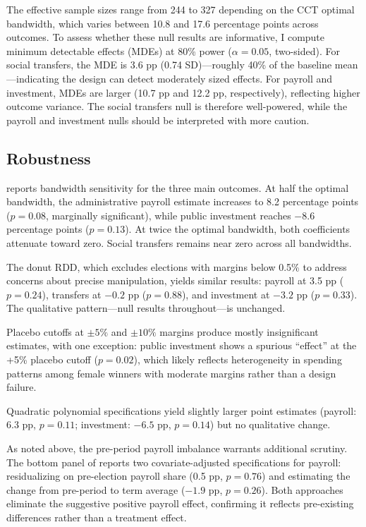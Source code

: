 \documentclass[12pt]{article}
\begin{document}
The effective sample sizes range from 244 to 327 depending on the CCT optimal bandwidth, which varies between 10.8 and 17.6 percentage points across outcomes. To assess whether these null results are informative, I compute minimum detectable effects (MDEs) at 80\% power ($\alpha=0.05$, two-sided). For social transfers, the MDE is 3.6 pp (0.74 SD)---roughly 40\% of the baseline mean---indicating the design can detect moderately sized effects. For payroll and investment, MDEs are larger (10.7 pp and 12.2 pp, respectively), reflecting higher outcome variance. The social transfers null is therefore well-powered, while the payroll and investment nulls should be interpreted with more caution.

\subsection{Robustness}



 reports bandwidth sensitivity for the three main outcomes. At half the optimal bandwidth, the administrative payroll estimate increases to 8.2 percentage points ($p = 0.08$, marginally significant), while public investment reaches $-8.6$ percentage points ($p = 0.13$). At twice the optimal bandwidth, both coefficients attenuate toward zero. Social transfers remains near zero across all bandwidths.

The donut RDD, which excludes elections with margins below 0.5\% to address concerns about precise manipulation, yields similar results: payroll at 3.5 pp ($p = 0.24$), transfers at $-0.2$ pp ($p = 0.88$), and investment at $-3.2$ pp ($p = 0.33$). The qualitative pattern---null results throughout---is unchanged.

Placebo cutoffs at $\pm 5\%$ and $\pm 10\%$ margins produce mostly insignificant estimates, with one exception: public investment shows a spurious ``effect'' at the +5\% placebo cutoff ($p = 0.02$), which likely reflects heterogeneity in spending patterns among female winners with moderate margins rather than a design failure.

Quadratic polynomial specifications yield slightly larger point estimates (payroll: 6.3 pp, $p=0.11$; investment: $-6.5$ pp, $p=0.14$) but no qualitative change.

As noted above, the pre-period payroll imbalance warrants additional scrutiny. The bottom panel of  reports two covariate-adjusted specifications for payroll: residualizing on pre-election payroll share (0.5 pp, $p=0.76$) and estimating the change from pre-period to term average ($-1.9$ pp, $p=0.26$). Both approaches eliminate the suggestive positive payroll effect, confirming it reflects pre-existing differences rather than a treatment effect.
\end{document}
